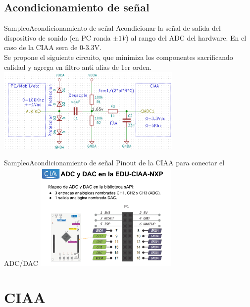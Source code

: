  \subsection{Acondicionamiento de señal}
 \begin{frame}[t]{Sampleo}{Acondicionamiento de señal}
    Acondicionar la señal de salida del dispositivo de sonido (en PC ronda $\pm1V$) al rango del ADC del hardware. En el caso de la CIAA sera de 0-3.3V. \\ 
    Se propone el siguiente circuito, que minimiza los componentes sacrificando calidad y agrega en filtro anti alias de 1er orden.
    \protoboardicon
    \center\includegraphics[width=9cm]{2_clase/circuito}
    \vfill
 \end{frame}
 \begin{frame}{Sampleo}{Acondicionamiento de señal}
    Pinout de la CIAA para conectar el ADC/DAC
    \protoboardicon
    \center\includegraphics[width=7cm]{2_clase/adc_dac_pins}
    \vfill
 \end{frame}
 \section{CIAA}
